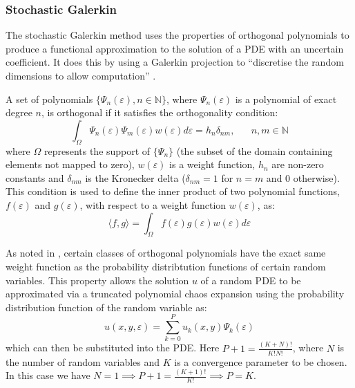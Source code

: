 \documentclass[11pt]{article}
\numberwithin{equation}{section}
\begin{document}
\subsubsection{Stochastic Galerkin}
The stochastic Galerkin method uses the properties of orthogonal polynomials to produce a functional approximation to the solution of a PDE with an uncertain coefficient. It does this by using a Galerkin projection to ``discretise the random dimensions to allow computation'' \cite{Paul}. 

A set of polynomials $\{\Psi_n(\varepsilon), n \in \mathbb{N}\}$, where $\Psi_n(\varepsilon)$ is a polynomial of exact degree $n$, is orthogonal if it satisfies the orthogonality condition:
\begin{equation}
\int_{\Omega} \Psi_n(\varepsilon) \Psi_m(\varepsilon) w(\varepsilon) d\varepsilon = h_n \delta_{nm}, \;\;\;\;\;\; n,m \in \mathbb{N}
\end{equation} 
where $\Omega$ represents the support of $\{\Psi_n\}$ (the subset of the domain containing elements not mapped to zero), $w(\varepsilon)$ is a weight function, $h_n$ are non-zero constants and $\delta_{nm}$ is the Kronecker delta ($\delta_{nm} = 1$ for $n=m$ and $0$ otherwise). This condition is used to define the inner product of two polynomial functions, $f(\varepsilon)$ and $g(\varepsilon)$, with respect to a weight function $w(\varepsilon)$, as:
\begin{equation}
\langle f, g \rangle = \int_{\Omega} f(\varepsilon)g(\varepsilon)w(\varepsilon) d\varepsilon
\end{equation}

As noted in \cite{Xiu}, certain classes of orthogonal polynomials have the exact same weight function as the probability distribtution functions of certain random variables. This property allows the solution $u$ of a random PDE to be approximated via a truncated polynomial chaos expansion using the probability distribution function of the random variable as:
\begin{equation}
u(x,y,\varepsilon) = \sum_{k=0}^P u_k(x,y) \Psi_k(\varepsilon)
\end{equation}
which can then be substituted into the PDE. Here $P+1 = \frac{(K+N)!}{K!N!}$, where $N$ is the number of random variables and $K$ is a convergence parameter to be chosen. In this case we have $N=1 \implies P+1=\frac{(K+1)!}{K!}\implies P=K$.

\end{document}
